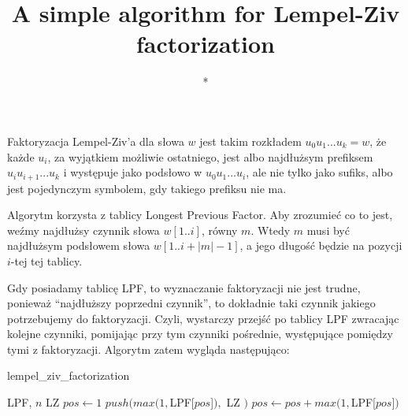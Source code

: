 \documentclass[a4paper,12pt]{article}
\title{A simple algorithm for Lempel-Ziv factorization}
\author{*}
\begin{document}
\maketitle

Faktoryzacja Lempel-Ziv'a dla słowa $w$ jest takim rozkładem $u_0 u_1 ... u_k = w$,
że każde $u_i$, za wyjątkiem możliwie ostatniego,
jest albo najdłużsym prefiksem $u_i u_{i + 1} ... u_k$ i występuje jako podsłowo w $u_0 u_1 ... u_i$,
ale nie tylko jako sufiks,
albo jest pojedynczym symbolem, gdy takiego prefiksu nie ma.

Algorytm korzysta z tablicy Longest Previous Factor.
Aby zrozumieć co to jest, weźmy najdłużsy czynnik słowa $w[1..i]$, równy $m$.
Wtedy $m$ musi być najdłużsym podsłowem słowa $w[1..i + |m| - 1]$,
a jego długość będzie na pozycji $i$-tej tej tablicy.

Gdy posiadamy tablicę LPF, to wyznaczanie faktoryzacji nie jest trudne,
ponieważ ``najdłuższy poprzedni czynnik'', to dokładnie taki czynnik jakiego potrzebujemy do faktoryzacji.
Czyli, wystarczy przejść po tablicy LPF zwracając kolejne czynniki,
pomijając przy tym czynniki pośrednie, występujące pomiędzy tymi z faktoryzacji.
Algorytm zatem wygląda następująco:

\begin{algorithm}
\caption{lempel\_ziv\_factorization}
\begin{algorithmic} 
\REQUIRE LPF, $n$
\ENSURE LZ
\STATE $pos \gets 1$
\STATE $push(max(1, $LPF[$pos$]$),$ LZ $)$
\STATE $pos \gets pos + max(1, $LPF[$pos$]$)$
\ENDWHILE
\end{algorithmic}
\end{algorithm}
\end{document}
